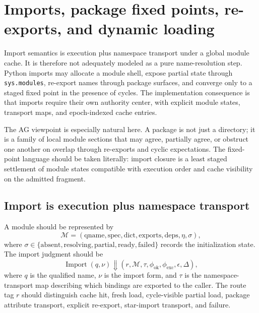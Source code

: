 \documentclass[11pt]{report}
\begin{document}
\chapter{Imports, package fixed points, re-exports, and dynamic loading}
Import semantics is execution plus namespace transport under a global module cache. It is therefore not adequately modeled as a pure name-resolution step. Python imports may allocate a module shell, expose partial state through \texttt{sys.modules}, re-export names through package surfaces, and converge only to a staged fixed point in the presence of cycles. The implementation consequence is that imports require their own authority center, with explicit module states, transport maps, and epoch-indexed cache entries.

The AG viewpoint is especially natural here. A package is not just a directory; it is a family of local module sections that may agree, partially agree, or obstruct one another on overlap through re-exports and cyclic expectations. The fixed-point language should be taken literally: import closure is a least staged settlement of module states compatible with execution order and cache visibility on the admitted fragment.
\section{Import is execution plus namespace transport}
 A module should be represented by
\[
\mathcal{M} = (\mathrm{qname},\mathrm{spec},\mathrm{dict},\mathrm{exports},\mathrm{deps},\eta,\sigma),
\]
where $\sigma\in\{\mathrm{absent},\mathrm{resolving},\mathrm{partial},\mathrm{ready},\mathrm{failed}\}$ records the initialization state. The import judgment should be
\[
\operatorname{Import}(q,\nu) \Downarrow (r,\mathcal{M},\tau,\phi_{\mathrm{ok}},\phi_{\mathrm{exc}},\epsilon,\Delta),
\]
where $q$ is the qualified name, $\nu$ is the import form, and $\tau$ is the namespace-transport map describing which bindings are exported to the caller. The route tag $r$ should distinguish cache hit, fresh load, cycle-visible partial load, package attribute transport, explicit re-export, star-import transport, and failure.
\end{document}
